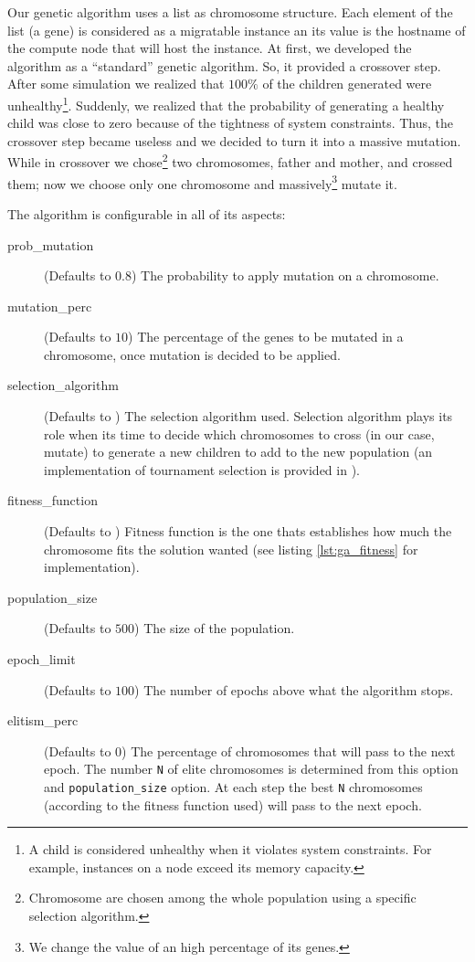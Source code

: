 Our genetic algorithm uses a list as chromosome structure. Each element of the list (a gene) is considered as a migratable instance an its value is the hostname of the compute node that will host the instance. At first, we developed the algorithm as a ``standard'' genetic algorithm. So, it provided a crossover step. After some simulation we realized that $100\%$ of the children generated were unhealthy\footnote{A child is considered unhealthy when it violates system constraints. For example, instances on a node exceed its memory capacity.}. Suddenly, we realized that the probability of generating a healthy child was close to zero because of the tightness of system constraints. Thus, the crossover step became useless and we decided to turn it into a massive mutation. While in crossover we chose\footnote{Chromosome are chosen among the whole population using a specific selection algorithm.} two chromosomes, father and mother, and crossed them; now we choose only one chromosome and massively\footnote{We change the value of an high percentage of its genes.} mutate it.

The algorithm is configurable in all of its aspects:
\begin{description}
	\item[prob\_mutation] (Defaults to $0.8$) The probability to apply mutation on a chromosome.
	\item[mutation\_perc] (Defaults to $10$) The percentage of the genes to be mutated in a chromosome, once mutation is decided to be applied.
	\item[selection\_algorithm] (Defaults to ) The selection algorithm used. Selection algorithm plays its role when its time to decide which chromosomes to cross (in our case, mutate) to generate a new children to add to the new population (an implementation of tournament selection is provided in ).
	\item[fitness\_function] (Defaults to ) Fitness function is the one thats establishes how much the chromosome fits the solution wanted (see listing \ref{lst:ga_fitness} for  implementation).
	\item[population\_size] (Defaults to $500$) The size of the population.
	\item[epoch\_limit] (Defaults to $100$) The number of epochs above what the algorithm stops.
	\item[elitism\_perc] (Defaults to $0$) The percentage of chromosomes that will pass to the next epoch. The number \texttt{N} of elite chromosomes is determined from this option and \texttt{population\_size} option. At each step the best \texttt{N} chromosomes (according to the fitness function used) will pass to the next epoch.
\end{description}

